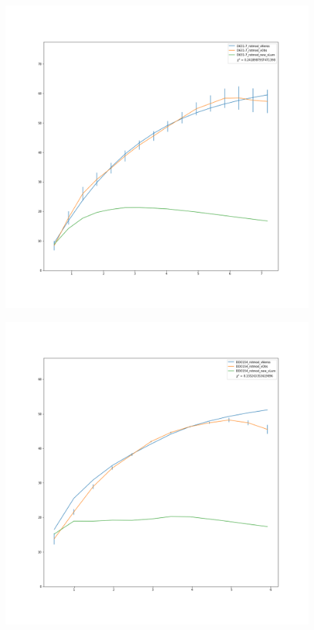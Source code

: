 \documentclass[reprint,%
 amsmath,amssymb,
 aps,
]{revtex4-1}
\begin{document}
\begin{figure}
\begin{minipage}{.5\textwidth}
  \label{fig:test2}
\end{minipage}
\begin{minipage}{.5\textwidth}
  \centering
  \includegraphics[width=.95\linewidth]{figures/D631-7_rotmod_XueSofue.png}
  \label{fig:test1}
\end{minipage}%
\begin{minipage}{.5\textwidth}
  \centering
  \includegraphics[width=.95\linewidth]{figures/DDO154_rotmod_XueSofue.png}

\end{minipage}
\end{figure}
\end{document}
